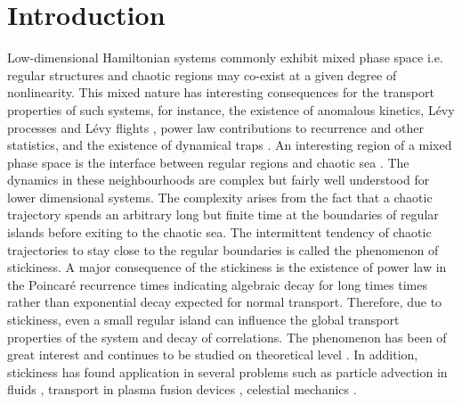 \documentclass[reprint,superscriptaddress,amsmath,amssymb,aps,pre]{revtex4-1}
\begin{document}
\section{Introduction} 
Low-dimensional Hamiltonian systems commonly exhibit mixed phase space i.e. 
regular structures and chaotic regions may co-exist at a given degree of 
nonlinearity. This mixed nature has interesting consequences for the transport
properties of such systems, for instance, the existence of anomalous kinetics,
L\'{e}vy processes and L\'{e}vy flights \cite{Klafter1994,Zaburdaev2015}, 
power law contributions to recurrence and other statistics, and the existence 
of dynamical traps \cite{Zaslavsky2002a,Zaslavsky2002b}. An interesting region 
of a mixed phase space is the interface between regular regions and chaotic 
sea \cite{Mackay1984, Easton1993}. The dynamics in these neighbourhoods are 
complex but fairly well understood \cite{Meiss2015} for lower dimensional 
systems. The complexity arises from the fact that a chaotic trajectory spends 
an arbitrary long but finite time at the boundaries of regular islands before 
exiting to the chaotic sea. The intermittent tendency of chaotic trajectories 
to stay close to the regular boundaries is called the phenomenon of 
stickiness. A major consequence of the stickiness is  the existence of power 
law in the Poincar{\'e} recurrence times indicating algebraic decay for long 
times times rather than exponential decay expected for normal transport. 
Therefore, due to stickiness, even a small regular island can influence the 
global transport properties of the system and decay of correlations. The 
phenomenon has been of great interest and continues to be studied on 
theoretical level \cite{Altmann2006, Altmann2010,Livorati2012,Bunimovich2012, 
Kruger2015}. In addition, stickiness has found application in several problems 
such as particle advection in fluids \cite{Babiano1994,Tel2005}, transport in 
plasma fusion devices \cite{Szezech2012,Martins2014}, celestial mechanics 
\cite{Efthymiopoulos1999, Harsoula2010, Harsoula2016}.
\end{document}
